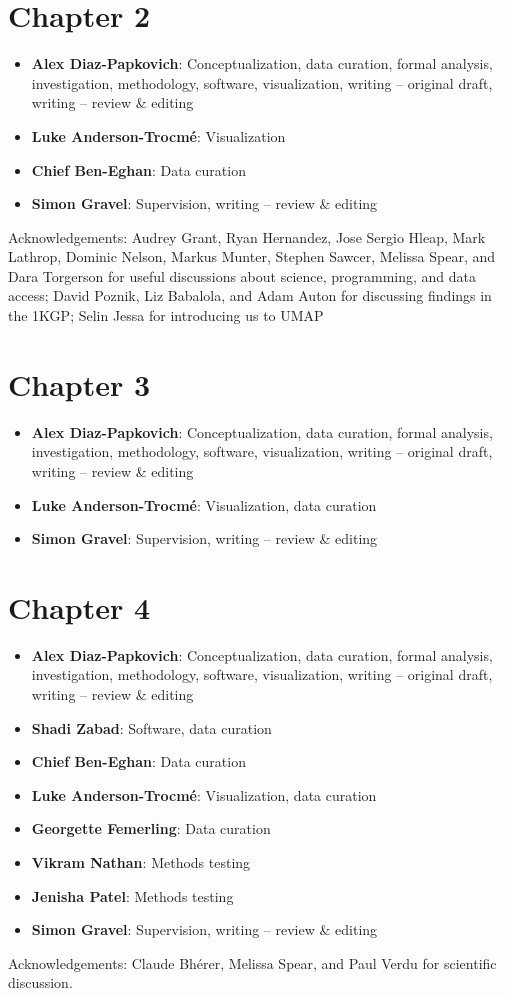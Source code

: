 \section*{Chapter 2}
\begin{itemize}
\item \textbf{Alex Diaz-Papkovich}: Conceptualization, data curation, formal analysis, investigation, methodology, software, visualization, writing -- original draft, writing -- review \& editing 
\item \textbf{Luke Anderson-Trocm\'{e}}: Visualization
\item \textbf{Chief Ben-Eghan}: Data curation
\item \textbf{Simon Gravel}: Supervision, writing -- review \& editing
\end{itemize}

Acknowledgements: Audrey Grant, Ryan Hernandez, Jose Sergio Hleap, Mark Lathrop, Dominic Nelson, Markus Munter, Stephen Sawcer, Melissa Spear, and Dara Torgerson for useful discussions about science, programming, and data access; David Poznik, Liz Babalola, and Adam Auton for discussing findings in the 1KGP; Selin Jessa for introducing us to UMAP

\section*{Chapter 3}

\begin{itemize}
\item \textbf{Alex Diaz-Papkovich}: Conceptualization, data curation, formal analysis, investigation, methodology, software, visualization, writing -- original draft, writing -- review \& editing
\item \textbf{Luke Anderson-Trocm\'{e}}: Visualization, data curation
\item \textbf{Simon Gravel}: Supervision, writing -- review \& editing
\end{itemize}

\section*{Chapter 4}
\begin{itemize}
\item \textbf{Alex Diaz-Papkovich}: Conceptualization, data curation, formal analysis, investigation, methodology, software, visualization, writing -- original draft, writing -- review \& editing
\item \textbf{Shadi Zabad}: Software, data curation
\item \textbf{Chief Ben-Eghan}: Data curation
\item \textbf{Luke Anderson-Trocm\'{e}}: Visualization, data curation
\item \textbf{Georgette Femerling}: Data curation
\item \textbf{Vikram Nathan}: Methods testing
\item \textbf{Jenisha Patel}: Methods testing
\item \textbf{Simon Gravel}: Supervision, writing -- review \& editing
\end{itemize}

Acknowledgements: Claude Bh\'{e}rer, Melissa Spear, and Paul Verdu for scientific discussion.
